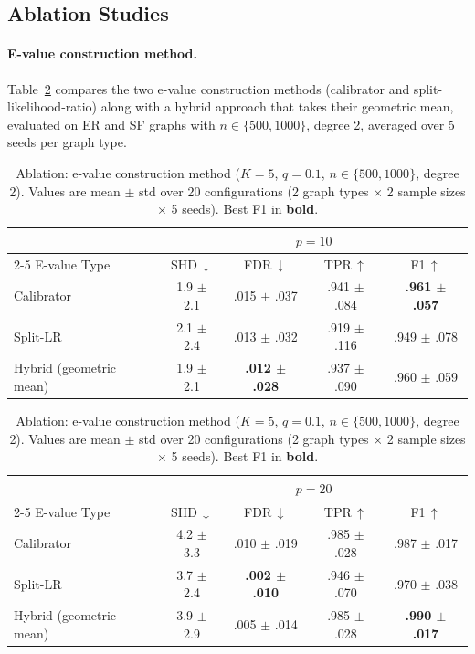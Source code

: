 \documentclass[11pt]{article}
\begin{document}
\subsection{Ablation Studies}

\paragraph{E-value construction method.}
Table~\ref{tab:ablation_eval} compares the two e-value construction methods (calibrator and split-likelihood-ratio) along with a hybrid approach that takes their geometric mean, evaluated on ER and SF graphs with $n \in \{500, 1000\}$, degree 2, averaged over 5 seeds per graph type.

\begin{table}[t]
\caption{Ablation: e-value construction method ($K = 5$, $q = 0.1$, $n \in \{500, 1000\}$, degree 2). Values are mean $\pm$ std over 20 configurations (2 graph types $\times$ 2 sample sizes $\times$ 5 seeds). Best F1 in \textbf{bold}.}
\label{tab:ablation_eval}
\centering
\small
\begin{tabular}{l cccc}
\toprule
 & \multicolumn{4}{c}{$p = 10$} \\
\cmidrule(lr){2-5}
E-value Type & SHD\,$\downarrow$ & FDR\,$\downarrow$ & TPR\,$\uparrow$ & F1\,$\uparrow$ \\
\midrule
Calibrator & 1.9 $\pm$ 2.1 & .015 $\pm$ .037 & .941 $\pm$ .084 & \textbf{.961 $\pm$ .057} \\
Split-LR & 2.1 $\pm$ 2.4 & .013 $\pm$ .032 & .919 $\pm$ .116 & .949 $\pm$ .078 \\
Hybrid (geometric mean) & 1.9 $\pm$ 2.1 & \textbf{.012 $\pm$ .028} & .937 $\pm$ .090 & .960 $\pm$ .059 \\
\bottomrule
\end{tabular}

\vspace{0.5em}

\begin{tabular}{l cccc}
\toprule
 & \multicolumn{4}{c}{$p = 20$} \\
\cmidrule(lr){2-5}
E-value Type & SHD\,$\downarrow$ & FDR\,$\downarrow$ & TPR\,$\uparrow$ & F1\,$\uparrow$ \\
\midrule
Calibrator & 4.2 $\pm$ 3.3 & .010 $\pm$ .019 & .985 $\pm$ .028 & .987 $\pm$ .017 \\
Split-LR & 3.7 $\pm$ 2.4 & \textbf{.002 $\pm$ .010} & .946 $\pm$ .070 & .970 $\pm$ .038 \\
Hybrid (geometric mean) & 3.9 $\pm$ 2.9 & .005 $\pm$ .014 & .985 $\pm$ .028 & \textbf{.990 $\pm$ .017} \\
\bottomrule
\end{tabular}


\end{table}
\end{document}

